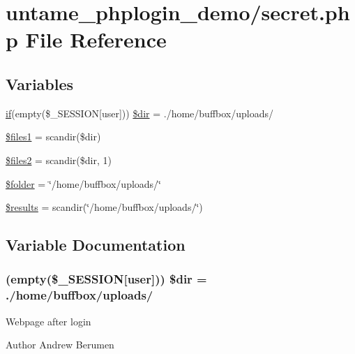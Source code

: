 \hypertarget{secret_8php}{}\section{untame\+\_\+phplogin\+\_\+demo/secret.php File Reference}
\label{secret_8php}
\subsection*{Variables}
\begin{DoxyCompactItemize}
\item 
\hyperlink{index_8php_a6f7e69680829fd3b12010f59897f7513}{if}(empty(\$\+\_\+\+S\+E\+S\+S\+I\+O\+N\mbox{[}\textquotesingle{}user\textquotesingle{}\mbox{]})) \hyperlink{secret_8php_af957162882c181e669c641ae91f650e6}{\$dir} = \textquotesingle{}./home/buffbox/uploads/\textquotesingle{}
\item 
\hyperlink{secret_8php_ab747bc60f1f1e91f2e63c33ecf45383b}{\$files1} = scandir(\$dir)
\item 
\hyperlink{secret_8php_a03df2b578a62dd604a097c85c7f7617d}{\$files2} = scandir(\$dir, 1)
\item 
\hyperlink{secret_8php_a5ade1bb16ee3a241cefc0b84918f1598}{\$folder} = \char`\"{}/home/buffbox/uploads/\char`\"{}
\item 
\hyperlink{secret_8php_a233d12bd8b6d3453e9a7a3f0b8c31db2}{\$results} = scandir(\char`\"{}/home/buffbox/uploads/\char`\"{})
\end{DoxyCompactItemize}


\subsection{Variable Documentation}
\hypertarget{secret_8php_af957162882c181e669c641ae91f650e6}{}
\subsubsection[{\$dir}]{ (empty(\$\+\_\+\+S\+E\+S\+S\+I\+O\+N\mbox{[}\textquotesingle{}user\textquotesingle{}\mbox{]})) \$dir = \textquotesingle{}./home/buffbox/uploads/\textquotesingle{}}\label{secret_8php_af957162882c181e669c641ae91f650e6}
Webpage after login \begin{DoxyAuthor}{Author}
Andrew Berumen 
\end{DoxyAuthor}
\hypertarget{secret_8php_ab747bc60f1f1e91f2e63c33ecf45383b}{}
